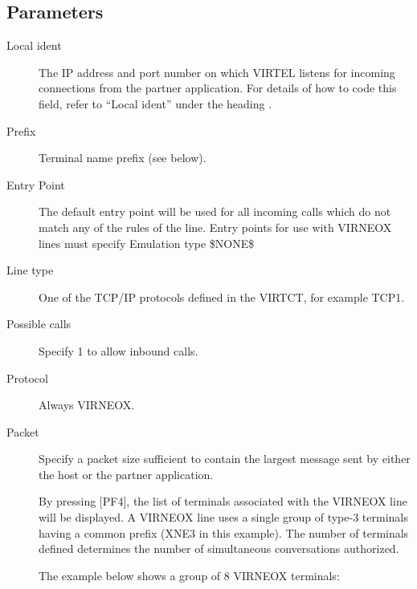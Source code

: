 \documentclass[letterpaper,10pt,english]{sphinxmanual}
\begin{document}

\ignorespaces 

\subsection{Parameters}
\label{\detokenize{connectivity_guide:index-59}}\label{\detokenize{connectivity_guide:id26}}\begin{description}
\item[{Local ident}] \leavevmode
The IP address and port number on which VIRTEL listens for incoming connections from the partner application. For details of how to code this field, refer to “Local ident” under the heading {\hyperref[\detokenize{connectivity_guide:bookmark13}]{}}.

\item[{Prefix}] \leavevmode
Terminal name prefix (see below).

\item[{Entry Point}] \leavevmode
The default entry point will be used for all incoming calls which do not match any of the rules of the line. Entry points for use with VIRNEOX lines must specify Emulation type \$NONE\$

\item[{Line type}] \leavevmode
One of the TCP/IP protocols defined in the VIRTCT, for example TCP1.

\item[{Possible calls}] \leavevmode
Specify 1 to allow inbound calls.

\item[{Protocol}] \leavevmode
Always VIRNEOX.

\item[{Packet}] \leavevmode
Specify a packet size sufficient to contain the largest message sent by either the host or the partner application.

By pressing {[}PF4{]}, the list of terminals associated with the VIRNEOX line will be displayed. A VIRNEOX line uses a single group of type-3 terminals having a common prefix (XNE3 in this example). The number of terminals defined determines the number of simultaneous conversations authorized.

The example below shows a group of 8 VIRNEOX terminals:

\end{description}
\end{document}
